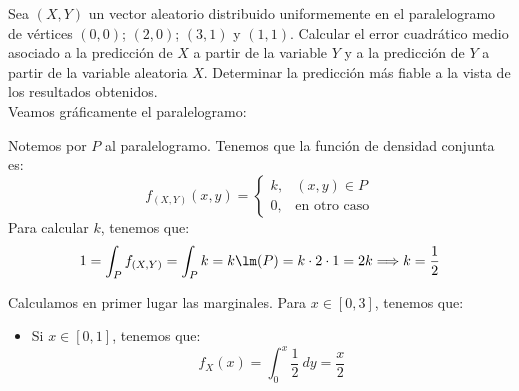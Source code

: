 \begin{ejercicio}
    Sea $(X,Y)$ un vector aleatorio distribuido uniformemente en el paralelogramo de vértices $(0,0)$; $(2,0)$; $(3,1)$ y $(1,1)$. Calcular el error cuadrático medio asociado a la predicción de $X$ a partir de la variable $Y$ y a la predicción de $Y$ a partir de la variable aleatoria $X$. Determinar la predicción más fiable a la vista de los resultados obtenidos.\\

    Veamos gráficamente el paralelogramo:
    \begin{figure}[H]
        \centering
    \end{figure}

    Notemos por $P$ al paralelogramo. Tenemos que la función de densidad conjunta es:
    \begin{equation*}
        f_{(X,Y)}(x, y) = \begin{cases}
            k, & (x, y)\in P\\
            0, & \text{en otro caso}
        \end{cases}
    \end{equation*}
    Para calcular $k$, tenemos que:
    \begin{equation*}
        1=\int_P f_{(X,Y)} = \int_P k = k\lm(P) = k\cdot 2\cdot 1 = 2k \Longrightarrow k = \dfrac{1}{2}
    \end{equation*}

    Calculamos en primer lugar las marginales. Para $x\in [0,3]$, tenemos que:
    \begin{itemize}
        \item Si $x\in [0,1]$, tenemos que:
        \begin{equation*}
            f_X(x) = \int_{0}^{x} \dfrac{1}{2} \ dy = \dfrac{x}{2}
        \end{equation*}


\end{itemize}
\end{ejercicio}
